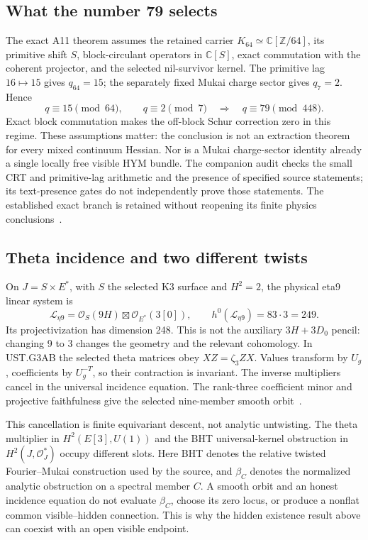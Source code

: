 \documentclass[11pt]{article}
\newcommand{\C}{\mathbb{C}}
\newcommand{\Z}{\mathbb{Z}}
\newcommand{\cO}{\mathcal{O}}
\theoremstyle{definition}
\theoremstyle{remark}
\begin{document}
\subsection{What the number 79 selects}
\label{sec:arithmetic-import}

The exact A11 theorem assumes the retained carrier
\(K_{64}\simeq\C[\Z/64]\), its primitive shift \(S\), block-circulant
operators in \(\C[S]\), exact commutation with the coherent projector,
and the selected nil-survivor kernel. The primitive lag \(16\mapsto15\)
gives \(q_{64}=15\); the separately fixed Mukai charge sector gives
\(q_7=2\). Hence
\[
 q\equiv15\pmod{64},\qquad q\equiv2\pmod7
 \quad\Longrightarrow\quad q\equiv79\pmod{448}.
\]
Exact block commutation makes the off-block Schur correction zero in this
regime. These assumptions matter: the conclusion is not an extraction
theorem for every mixed continuum Hessian. Nor is a Mukai charge-sector
identity already a single locally free visible HYM bundle. The companion
audit checks the small CRT and primitive-lag arithmetic and the presence
of specified source statements; its text-presence gates do not independently
prove those statements. The established exact branch is retained without
reopening its finite physics conclusions~\cite{FluxArithmetic}.

\subsection{Theta incidence and two different twists}
\label{sec:theta-import}

On \(J=S\times E^*\), with \(S\) the selected K3 surface and
\(H^2=2\), the physical eta9 linear system is
\[
 \mathcal L_{\eta9}=\cO_S(9H)\boxtimes\cO_{E^*}(3[0]),
 \qquad h^0(\mathcal L_{\eta9})=83\cdot3=249.
\]
Its projectivization has dimension 248. This is not the auxiliary
\(3H+3D_0\) pencil: changing 9 to 3 changes the geometry and the relevant
cohomology. In UST.G3AB the selected theta matrices obey
\(XZ=\zeta_3ZX\). Values transform by \(U_g\), coefficients by
\(U_g^{-T}\), so their contraction is invariant. The inverse multipliers
cancel in the universal incidence equation. The rank-three coefficient
minor and projective faithfulness give the selected nine-member smooth
orbit~\cite{FluxSource}.

This cancellation is finite equivariant descent, not analytic untwisting.
The theta multiplier in \(H^2(E[3],U(1))\) and the BHT universal-kernel
obstruction in \(H^2(J,\cO_J^*)\) occupy different slots. Here BHT denotes
the relative twisted Fourier--Mukai construction used by the source, and
\(\beta_C\) denotes the normalized analytic obstruction on a spectral
member \(C\). A smooth orbit and an honest incidence equation do not
evaluate \(\beta_C\), choose its zero locus, or produce a nonflat common
visible--hidden connection. This is why the hidden existence result above
can coexist with an open visible endpoint.
\end{document}
